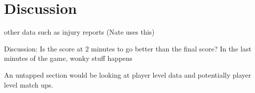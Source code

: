 \section{Discussion}
other data such as injury reports (Nate uses this)

Discussion: Is the score at 2 minutes to go better than the final score? In the last minutes of the game, wonky stuff happens

An untapped section would be looking at player level data and potentially player level match ups. 